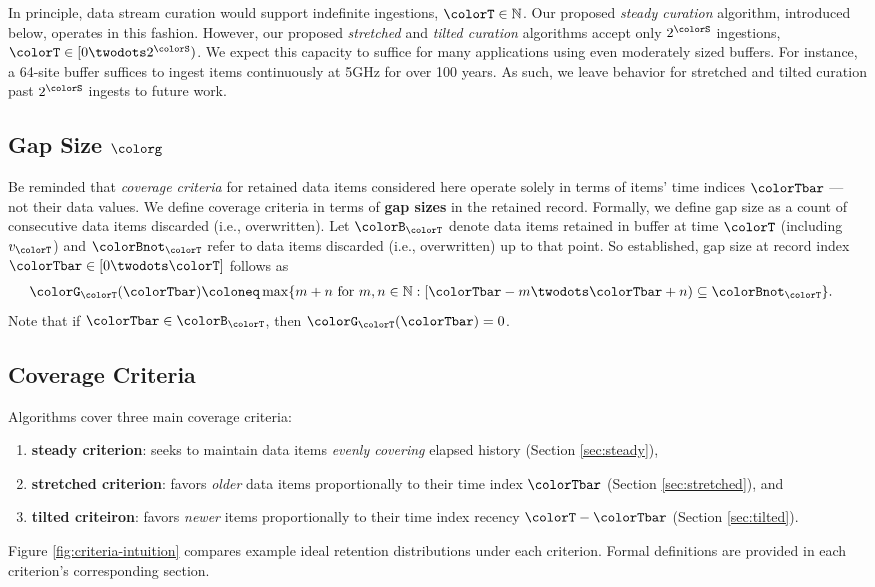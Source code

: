 In principle, data stream curation would support indefinite ingestions, $\colorT \in \mathbb{N}$.
Our proposed \textit{steady curation} algorithm, introduced below, operates in this fashion.
However, our proposed \textit{stretched} and \textit{tilted curation} algorithms accept only $2^{\colorS}$ ingestions, $\colorT \in [0 \twodots 2^{\colorS})$.
We expect this capacity to suffice for many applications using even moderately sized buffers.
For instance, a 64-site buffer suffices to ingest items continuously at 5GHz for over 100 years.
As such, we leave behavior for stretched and tilted curation past $2^{\colorS}$ ingests to future work.

\subsection{Gap Size $\colorg$}
\label{sec:notation-gapsize}

Be reminded that \textit{coverage criteria} for retained data items considered here operate solely in terms of items' time indices $\colorTbar$ --- not their data values.
We define coverage criteria in terms of \textbf{gap sizes} in the retained record.
Formally, we define gap size as a count of consecutive data items discarded (i.e., overwritten).
Let $\colorB_{\colorT}$ denote data items retained in buffer at time $\colorT$ (including $v_{\colorT}$) and $\colorBnot_{\colorT}$ refer to data items discarded (i.e., overwritten) up to that point.
So established, gap size at record index $\colorTbar \in [0 \twodots \colorT]$ follows as
\begin{align}
\colorG_{\colorT}(\colorTbar)
&\coloneq
\max
\{
  m + n
  \text{ for }
  m, n \in \mathbb{N}
  :
  [\colorTbar-m \twodots \colorTbar+n) \subseteq \colorBnot_{\colorT}
\}.
\label{eqn:gap-size-defn}
\end{align}
Note that if $\colorTbar \in \colorB_{\colorT}$, then $\colorG_{\colorT}(\colorTbar) = 0$.

\subsection{Coverage Criteria}
\label{sec:notation-coverage}

Algorithms cover three main coverage criteria:
\begin{enumerate}
\item \textbf{steady criterion}: seeks to maintain data items \textit{evenly covering} elapsed history (Section \ref{sec:steady}),
\item \textbf{stretched criterion}: favors \textit{older} data items proportionally to their time index $\colorTbar$ (Section \ref{sec:stretched}), and
\item \textbf{tilted criteiron}: favors \textit{newer} items proportionally to their time index recency $\colorT - \colorTbar$ (Section \ref{sec:tilted}).
\end{enumerate}
Figure \ref{fig:criteria-intuition} compares example ideal retention distributions under each criterion.
Formal definitions are provided in each criterion's corresponding section.

